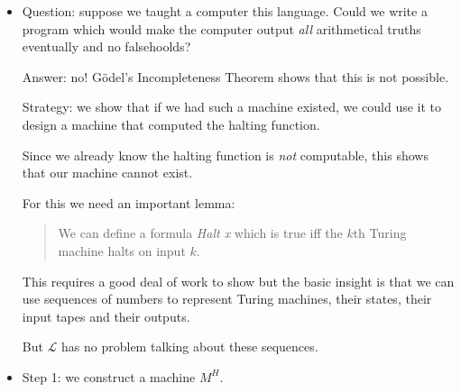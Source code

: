 \documentclass[justified]{tufte-handout}
\begin{document}
\begin{itemize}

\item Question: suppose we taught a computer this language. Could we write a program which would make the computer output \emph{all} arithmetical truths eventually and no falsehoolds?

\vspace{.2cm}

\noindent Answer: no! G\"{o}del's Incompleteness Theorem shows that this is not possible.

\vspace{.7cm}


 \noindent Strategy: we show that if we had such a machine existed, we could use it to design a machine that computed the halting function.

\vspace{.2cm}

\noindent Since we already know the halting function is \emph{not} computable, this shows that our machine cannot exist.


\vspace{.7cm}


 \noindent For this we need an important lemma:

\vspace{.2cm}


\begin{quote}

We can define a formula \emph{Halt x} which is true iff the $k$th Turing machine halts on input $k$.

\end{quote}

\vspace{.2cm}

\noindent This requires a good deal of work to show but the basic insight is that we can use sequences of numbers to represent Turing machines, their states, their input tapes and their outputs.

 \vspace{.2cm}

\noindent But $\mathcal{L}$ has no problem talking about these sequences.

\vspace{.7cm}


\item Step 1: we construct a machine $M^H$.


\end{itemize}
\end{document}
